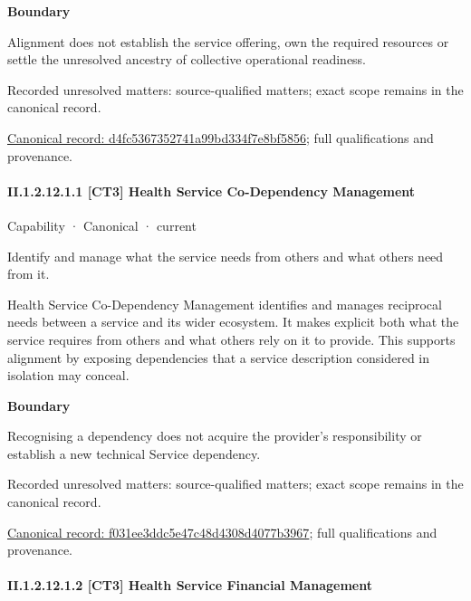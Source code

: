 \textbf{Boundary}



Alignment does not establish the service offering, own the required resources or settle the unresolved ancestry of collective operational readiness.


{\small Recorded unresolved matters: source-qualified matters; exact scope remains in the canonical record.}\par
{\footnotesize \href{../../../../../../../continuum/strategy/capability/d4fc5367352741a99bd334f7e8bf5856.md}{Canonical record: d4fc5367352741a99bd334f7e8bf5856}; full qualifications and provenance.}\par
\paragraph*{II.1.2.12.1.1 [CT3] Health Service Co-Dependency Management}
\label{navigation:II.1.2.12.1.1}

\label{element:f031ee3ddc5e47c48d4308d4077b3967}
{\small Capability · Canonical · current}\par

Identify and manage what the service needs from others and what others need from it.



Health Service Co-Dependency Management identifies and manages reciprocal needs between a service and its wider ecosystem. It makes explicit both what the service requires from others and what others rely on it to provide. This supports alignment by exposing dependencies that a service description considered in isolation may conceal.



\textbf{Boundary}



Recognising a dependency does not acquire the provider's responsibility or establish a new technical Service dependency.


{\small Recorded unresolved matters: source-qualified matters; exact scope remains in the canonical record.}\par
{\footnotesize \href{../../../../../../../continuum/strategy/capability/f031ee3ddc5e47c48d4308d4077b3967.md}{Canonical record: f031ee3ddc5e47c48d4308d4077b3967}; full qualifications and provenance.}\par
\paragraph*{II.1.2.12.1.2 [CT3] Health Service Financial Management}
\label{navigation:II.1.2.12.1.2}

